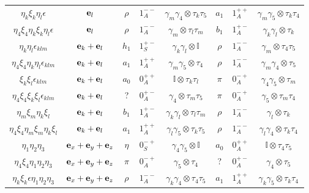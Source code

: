 \begin{table}
\begin{center}
\begin{tabular}{c|c|ccc|ccc}
$\eta _k\xi _k \eta _l \epsilon$            & ${\bf e}_l$                     & $\rho$   & $1^{--}_A$ & $\gamma _m\gamma _4\otimes \tau _k \tau _5$  & $a_1$    & $1^{++}_A$ & $\gamma _m\gamma _5\otimes \tau _k\tau _4$ \\
$\eta_4\xi_4\eta_k\xi_k\eta_l\epsilon$      & ${\bf e}_l$                     & $\rho$   & $1^{--}_A$ & $\gamma _m \otimes \tau _l\tau _m$           & $b_1$    & $1^{+-}_A$ & $\gamma _k\gamma _l \otimes \tau _k$ \\
$\eta _k\eta _l \epsilon _{klm}$            & ${\bf e}_k+{\bf e}_l$           & $h_1$    & $1^{+-}_S$ & $\gamma _k\gamma _l\otimes \mathbb{I}$       & $\rho$   & $1^{--}_A$ & $\gamma _m\otimes \tau _4\tau _5$ \\
$\eta_4\xi_4\eta _k\eta _l \epsilon _{klm}$ & ${\bf e}_k+{\bf e}_l$           & $a_1$    & $1^{++}_A$ & $\gamma _m\gamma _5\otimes \tau _4$          & $\rho$   & $1^{--}_A$ & $\gamma _m\gamma _4\otimes \tau _5$ \\
$\xi _k\xi _l \epsilon _{klm}$              & ${\bf e}_k+{\bf e}_l$           & $a_0$    & $0^{++}_A$ & $\mathbb{I}\otimes \tau _k\tau _l$           & $\pi$    & $0^{-+}_A$ & $\gamma _4\gamma _5\otimes \tau _m$ \\
$\eta_4\xi_4\xi _k\xi _l \epsilon _{klm}$   & ${\bf e}_k+{\bf e}_l$           & ?        & $0^{+-}_A$ & $\gamma _4\otimes \tau _m\tau _5$            & $\pi$    & $0^{-+}_A$ & $\gamma _5\otimes \tau _m\tau _4$ \\
$\eta _m\xi _m\eta _k\xi _l$                & ${\bf e}_k+{\bf e}_l$           & $b_1$    & $1^{+-}_A$ & $\gamma _k\gamma _l\otimes \tau _l \tau _m$  & $\rho$   & $1^{--}_A$ & $\gamma _l\otimes \tau _k$ \\
$\eta_4\xi_4\eta _m\xi _m\eta _k\xi _l$     & ${\bf e}_k+{\bf e}_l$           & $a_1$    & $1^{++}_A$ & $\gamma _l\gamma _5\otimes \tau _k \tau _5$  & $\rho$   & $1^{--}_A$ & $\gamma _l\gamma _4\otimes \tau _k\tau _4$ \\
$\eta _1\eta _2\eta _3$                     & ${\bf e}_x+{\bf e}_y+{\bf e}_z$ & $\eta$   & $0^{-+}_S$ & $\gamma _4\gamma _5\otimes \mathbb{I}$       & $a_0$    & $0^{++}_A$ & $\mathbb{I}\otimes \tau _4\tau _5$ \\
$\eta_4\xi_4\eta _1\eta _2\eta _3$          & ${\bf e}_x+{\bf e}_y+{\bf e}_z$ & $\pi$    & $0^{-+}_A$ & $\gamma _5\otimes \tau _4$                   & ?        & $0^{+-}_A$ & $\gamma _4\otimes \tau _5$ \\
$\eta_k\xi_k\epsilon\eta _1\eta _2\eta _3$  & ${\bf e}_x+{\bf e}_y+{\bf e}_z$ & $\rho$   & $1^{--}_A$ & $\gamma _k\gamma _4\otimes \tau _4\tau _5$   & $a_1$    & $1^{++}_A$ & $\gamma _k\gamma _5\otimes \tau _k\tau _4$ \\

\end{tabular}
\end{center}
\end{table}
